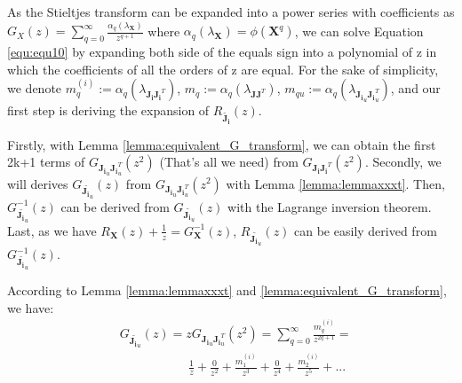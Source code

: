\documentclass[10pt,journal,compsoc]{IEEEtran}
\begin{document}
As the Stieltjes transform can be expanded into a power series with coefficients as $G_X(z)=\sum_{q=0}^{\infty}\frac{\alpha_q(\lambda_{\mathbf{X}})}{z^{q+1}}$ where $\alpha_q(\lambda_{\mathbf{X}})=\phi(\mathbf{X}^q)$, we can solve Equation \eqref{equ:equ10} by expanding both side of the equals sign into a polynomial of z in which the coefficients of all the orders of z are equal. For the sake of simplicity, we denote $m^{(i)}_q := \alpha_q(\lambda_{\mathbf{J_iJ_i}^T})$, $m_q := \alpha_q(\lambda_{\mathbf{JJ}^T})$, $m_{qu}:= \alpha_q(\lambda_{\mathbf{J_i}_u\mathbf{J_i}_u^T})$, and our first step is deriving the expansion of $R_{\widetilde{\mathbf{J_i}}}(z)$.

Firstly, with Lemma \ref{lemma:equivalent_G_transform}, we can obtain the first 2k+1 terms of $G_{\mathbf{J_i}_u\mathbf{J_i}_u^T}(z^2)$ (That's all we need) from $G_{\mathbf{J_i}\mathbf{J_i}^T}(z^2)$. Secondly, we will derives $G_{\widetilde{\mathbf{J_i}_u}}(z)$ from $G_{\mathbf{J_i}_u\mathbf{J_i}_u^T}(z^2)$ with Lemma \ref{lemma:lemmaxxxt}. Then, $G^{-1}_{\widetilde{\mathbf{J_i}_u}}(z)$ can be derived from $G_{\widetilde{\mathbf{J_i}_u}}(z)$ with the Lagrange inversion theorem. Last, as we have $R_{\mathbf{X}}(z) + \frac{1}{z} = G_{\mathbf{X}}^{-1}(z)$, $R_{\widetilde{\mathbf{J_i}_u}}(z)$ can be easily derived from $G_{\widetilde{\mathbf{J_i}_u}}^{-1}(z)$.

According to Lemma \ref{lemma:lemmaxxxt} and \ref{lemma:equivalent_G_transform}, we have:
\begin{equation}
\begin{split}
    & G_{\widetilde{\mathbf{J_i}_u}}(z)=zG_{\mathbf{J_i}_u\mathbf{J_i}_u^T}(z^2)=\sum_{q=0}^\infty \frac{m^{(i)}_q}{z^{2q+1}} =\\
    & ~~~~~~~~~~~~~~~~~~~~~~~~~\frac{1}{z} + \frac{0}{z^2} + \frac{m^{(i)}_1}{z^3}+\frac{0}{z^4} + \frac{m^{(i)}_2}{z^5}+...
\end{split}
\label{equ:GJ(z)}
\end{equation}
\end{document}
